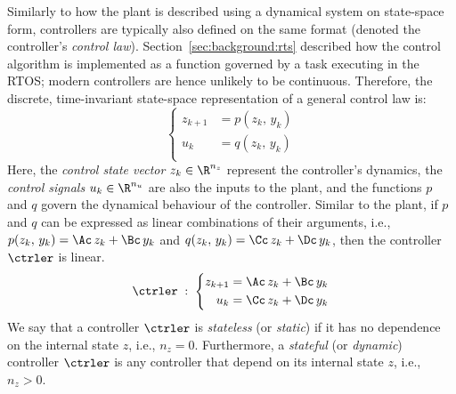 Similarly to how the plant is described using a dynamical system on state-space form, controllers are typically also defined on the same format (denoted the controller's \emph{control law}).
Section~\ref{sec:background:rts} described how the control algorithm is implemented as a function governed by a task executing in the RTOS; modern controllers are hence unlikely to be continuous.
Therefore, the discrete, time-invariant state-space representation of a general control law is:
%
\begin{equation}%
    \label{eq:discrete-state-space}%
    \left\{\begin{aligned}
        z_{k+1} &= p(z_k,\, y_k) \\
        u_k &= q(z_k,\, y_k) \\
    \end{aligned}\right.
\end{equation}
%
Here, the \emph{control state vector} $z_k \in \R^{n_z}$ represent the controller's dynamics, the \emph{control signals} $u_k \in \R^{n_u}$ are also the inputs to the plant, and the functions $p$ and $q$ govern the dynamical behaviour of the controller.
Similar to the plant, if $p$ and $q$ can be expressed as linear combinations of their arguments, i.e., $p(z_k,\, y_k) = \Ac\,z_k+\Bc\,y_k$ and $q(z_k,\, y_k) = \Cc\,z_k+\Dc\,y_k$, then the controller $\ctrler$ is linear.
%
\begin{equation}%
    \label{eq:discrete-lti-ctrler}%
    \ctrler \; : \; \left\{\begin{aligned}
        z_{k+1} &= \Ac\,z_k + \Bc\,y_k \\
        u_k &= \Cc\,z_k + \Dc\,y_k \\
    \end{aligned}\right.
\end{equation}
%
We say that a controller $\ctrler$ is \emph{stateless} (or \emph{static}) if it has no dependence on the internal state $z$, i.e., $n_z = 0$.
Furthermore, a \emph{stateful} (or \emph{dynamic}) controller $\ctrler$ is any controller that depend on its internal state $z$, i.e., $n_z > 0$.

